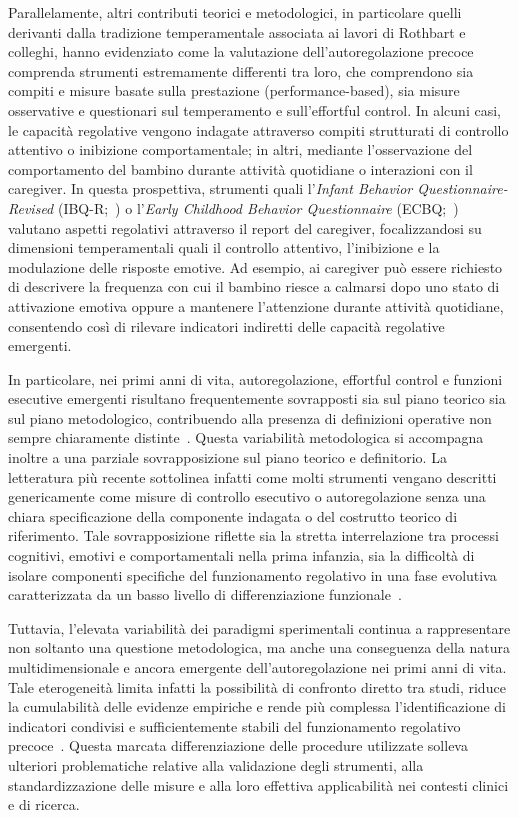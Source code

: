             Parallelamente, altri contributi teorici e metodologici, in particolare quelli derivanti dalla tradizione temperamentale associata ai lavori di Rothbart e colleghi, hanno evidenziato come la valutazione dell'autoregolazione precoce comprenda strumenti estremamente differenti tra loro, che comprendono sia compiti e misure basate sulla prestazione (performance-based), sia misure osservative e questionari sul temperamento e sull'effortful control. In alcuni casi, le capacità regolative vengono indagate attraverso compiti strutturati di controllo attentivo o inibizione comportamentale; in altri, mediante l'osservazione del comportamento del bambino durante attività quotidiane o interazioni con il caregiver. In questa prospettiva, strumenti quali l'\emph{Infant Behavior Questionnaire-Revised} (IBQ-R;~\cite{gartstein2003}) o l'\emph{Early Childhood Behavior Questionnaire} (ECBQ;~\cite{putnam2006}) valutano aspetti regolativi attraverso il report del caregiver, focalizzandosi su dimensioni temperamentali quali il controllo attentivo, l'inibizione e la modulazione delle risposte emotive. Ad esempio, ai caregiver può essere richiesto di descrivere la frequenza con cui il bambino riesce a calmarsi dopo uno stato di attivazione emotiva oppure a mantenere l'attenzione durante attività quotidiane, consentendo così di rilevare indicatori indiretti delle capacità regolative emergenti.

            In particolare, nei primi anni di vita, autoregolazione, effortful control e funzioni esecutive emergenti risultano frequentemente sovrapposti sia sul piano teorico sia sul piano metodologico, contribuendo alla presenza di definizioni operative non sempre chiaramente distinte~\cite{rothbart2006,toplak2013}. Questa variabilità metodologica si accompagna inoltre a una parziale sovrapposizione sul piano teorico e definitorio. La letteratura più recente sottolinea infatti come molti strumenti vengano descritti genericamente come misure di controllo esecutivo o autoregolazione senza una chiara specificazione della componente indagata o del costrutto teorico di riferimento. Tale sovrapposizione riflette sia la stretta interrelazione tra processi cognitivi, emotivi e comportamentali nella prima infanzia, sia la difficoltà di isolare componenti specifiche del funzionamento regolativo in una fase evolutiva caratterizzata da un basso livello di differenziazione funzionale~\cite{doebel2020,berni2025}.

            Tuttavia, l'elevata variabilità dei paradigmi sperimentali continua a rappresentare non soltanto una questione metodologica, ma anche una conseguenza della natura multidimensionale e ancora emergente dell'autoregolazione nei primi anni di vita. Tale eterogeneità limita infatti la possibilità di confronto diretto tra studi, riduce la cumulabilità delle evidenze empiriche e rende più complessa l'identificazione di indicatori condivisi e sufficientemente stabili del funzionamento regolativo precoce~\cite{toplak2013,snyder2021}. Questa marcata differenziazione delle procedure utilizzate solleva ulteriori problematiche relative alla validazione degli strumenti, alla standardizzazione delle misure e alla loro effettiva applicabilità nei contesti clinici e di ricerca.

